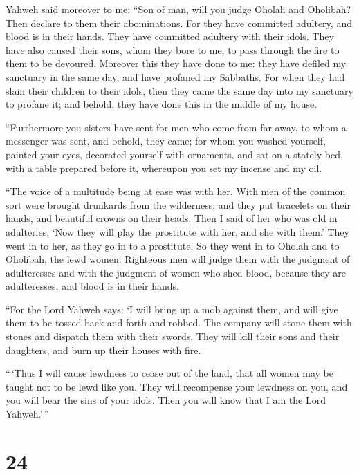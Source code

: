  Yahweh said moreover to me: ``Son of man, will you judge
Oholah and Oholibah? Then declare to them their abominations.
 For they have committed adultery, and blood is in their
hands. They have committed adultery with their idols. They have also
caused their sons, whom they bore to me, to pass through the fire to
them to be devoured.  Moreover this they have done to me:
they have defiled my sanctuary in the same day, and have profaned my
Sabbaths.  For when they had slain their children to their
idols, then they came the same day into my sanctuary to profane it; and
behold, they have done this in the middle of my house.

 ``Furthermore you sisters have sent for men who come from
far away, to whom a messenger was sent, and behold, they came; for whom
you washed yourself, painted your eyes, decorated yourself with
ornaments,  and sat on a stately bed, with a table prepared
before it, whereupon you set my incense and my oil.

 ``The voice of a multitude being at ease was with her.
With men of the common sort were brought drunkards from the wilderness;
and they put bracelets on their hands, and beautiful crowns on their
heads.  Then I said of her who was old in adulteries, `Now
they will play the prostitute with her, and she with them.'
 They went in to her, as they go in to a prostitute. So
they went in to Oholah and to Oholibah, the lewd women. 
Righteous men will judge them with the judgment of adulteresses and with
the judgment of women who shed blood, because they are adulteresses, and
blood is in their hands.

 ``For the Lord Yahweh says: `I will bring up a mob against
them, and will give them to be tossed back and forth and robbed.
 The company will stone them with stones and dispatch them
with their swords. They will kill their sons and their daughters, and
burn up their houses with fire.

 ``\,`Thus I will cause lewdness to cease out of the land,
that all women may be taught not to be lewd like you.  They
will recompense your lewdness on you, and you will bear the sins of your
idols. Then you will know that I am the Lord Yahweh.'\,''

\hypertarget{section-22}{%
\section{24}\label{section-22}}

